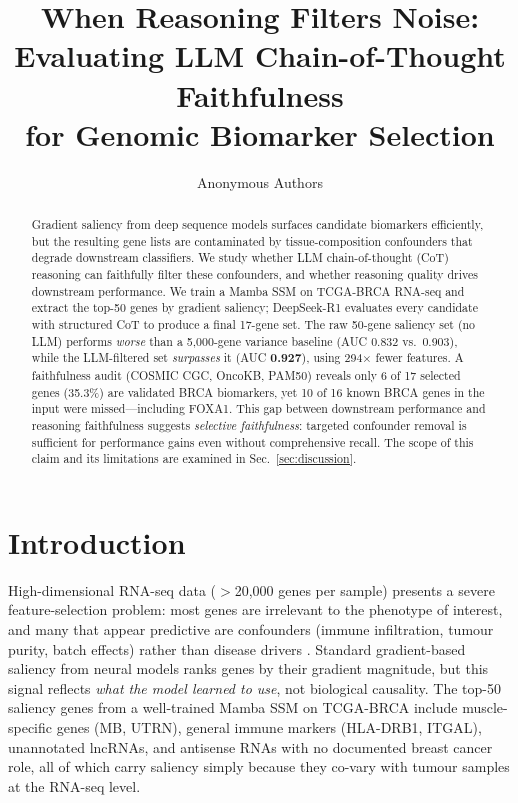 \documentclass{article}
\title{When Reasoning Filters Noise:\\
Evaluating LLM Chain-of-Thought Faithfulness\\
for Genomic Biomarker Selection}
\author{Anonymous Authors}
\begin{document}
\maketitle

\begin{abstract}
Gradient saliency from deep sequence models surfaces candidate biomarkers
efficiently, but the resulting gene lists are contaminated by
tissue-composition confounders that degrade downstream classifiers.
We study whether LLM chain-of-thought (CoT) reasoning can faithfully filter
these confounders, and whether reasoning quality drives downstream performance.
We train a Mamba SSM on TCGA-BRCA RNA-seq and extract the top-50 genes by
gradient saliency; DeepSeek-R1 evaluates every candidate with structured
CoT to produce a final 17-gene set.
The raw 50-gene saliency set (no LLM) performs \emph{worse} than a
5,000-gene variance baseline (AUC 0.832 vs.\ 0.903), while the
LLM-filtered set \emph{surpasses} it (AUC \textbf{0.927}), using
294$\times$ fewer features.
A faithfulness audit (COSMIC CGC, OncoKB, PAM50) reveals only 6 of 17
selected genes (35.3\%) are validated BRCA biomarkers, yet 10 of 16 known
BRCA genes in the input were missed---including FOXA1.
This gap between downstream performance and reasoning faithfulness
suggests \emph{selective faithfulness}: targeted confounder removal is
sufficient for performance gains even without comprehensive recall.
The scope of this claim and its limitations are examined in
Sec.~\ref{sec:discussion}.
\end{abstract}

\section{Introduction}
\label{sec:intro}

High-dimensional RNA-seq data ($>$20,000 genes per sample) presents a
severe feature-selection problem: most genes are irrelevant to the
phenotype of interest, and many that appear predictive are confounders
(immune infiltration, tumour purity, batch effects) rather than disease
drivers \citep{pudjihartono2022review}.
Standard gradient-based saliency from neural models ranks genes by their
gradient magnitude, but this signal reflects \emph{what the model learned
to use}, not biological causality.
The top-50 saliency genes from a well-trained Mamba SSM on TCGA-BRCA
include muscle-specific genes (MB, UTRN), general immune markers
(HLA-DRB1, ITGAL), unannotated lncRNAs, and antisense RNAs with no
documented breast cancer role, all of which carry saliency simply because
they co-vary with tumour samples at the RNA-seq level.
\end{document}
